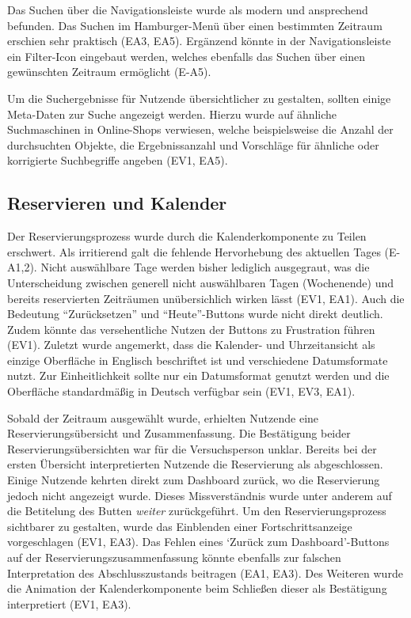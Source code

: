 Das Suchen über die Navigationsleiste wurde als modern und ansprechend befunden. Das Suchen im
Hamburger-Menü über einen bestimmten Zeitraum erschien sehr praktisch (EA3, EA5). Ergänzend könnte
in der Navigationsleiste ein Filter-Icon eingebaut werden, welches ebenfalls das Suchen über einen
gewünschten Zeitraum ermöglicht (E-A5).

Um die Suchergebnisse für Nutzende übersichtlicher zu gestalten, sollten einige Meta-Daten zur
Suche angezeigt werden. Hierzu wurde auf ähnliche Suchmaschinen in Online-Shops verwiesen, welche
beispielsweise die Anzahl der durchsuchten Objekte, die Ergebnissanzahl und Vorschläge für ähnliche
oder korrigierte Suchbegriffe angeben (EV1, EA5). 

\subsection{Reservieren und Kalender}
Der Reservierungsprozess wurde durch die Kalenderkomponente zu Teilen erschwert. Als irritierend
galt die fehlende Hervorhebung des aktuellen Tages (E-A1,2). Nicht auswählbare Tage werden bisher
lediglich ausgegraut, was die Unterscheidung zwischen generell nicht auswählbaren Tagen (Wochenende)
und bereits reservierten Zeiträumen unübersichlich wirken lässt (EV1, EA1). Auch die Bedeutung
\enquote{Zurücksetzen} und \enquote{Heute}-Buttons wurde nicht direkt deutlich. Zudem könnte das
versehentliche Nutzen der Buttons zu Frustration führen (EV1). Zuletzt wurde angemerkt, dass die
Kalender- und Uhrzeitansicht als einzige Oberfläche in Englisch beschriftet ist und verschiedene
Datumsformate nutzt. Zur Einheitlichkeit sollte nur ein Datumsformat genutzt werden und die
Oberfläche standardmäßig in Deutsch verfügbar sein (EV1, EV3, EA1). 

Sobald der Zeitraum ausgewählt wurde, erhielten Nutzende eine Reservierungsübersicht und
Zusammenfassung. Die Bestätigung beider Reservierungsübersichten war für die Versuchsperson unklar.
Bereits bei der ersten Übersicht interpretierten Nutzende die Reservierung als abgeschlossen. Einige
Nutzende kehrten direkt zum Dashboard zurück, wo die Reservierung jedoch nicht angezeigt wurde.
Dieses Missverständnis wurde unter anderem auf die Betitelung des Butten \textit{weiter}
zurückgeführt. Um den Reservierungsprozess sichtbarer zu gestalten, wurde das Einblenden einer
Fortschrittsanzeige vorgeschlagen (EV1, EA3). Das Fehlen eines \enquote*{Zurück zum Dashboard}-Buttons
auf der Reservierungszusammenfassung könnte ebenfalls zur falschen Interpretation des
Abschlusszustands beitragen (EA1, EA3). Des Weiteren wurde die Animation der Kalenderkomponente beim
Schließen dieser als Bestätigung interpretiert (EV1, EA3).

